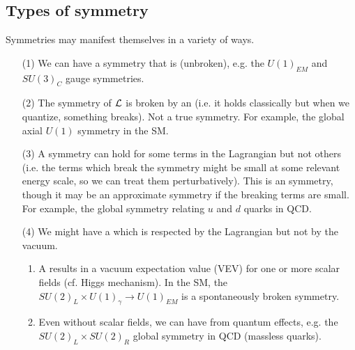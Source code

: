 \subsection*{Types of symmetry}
Symmetries may manifest themselves in a variety of ways.
\begin{enumerate}
    \item[(1)] We can have a symmetry that is  (unbroken), e.g. the $U(1)_{EM}$ and $SU(3)_C$ gauge symmetries.
    \item[(2)] The symmetry of $\mathcal L$ is broken by an  (i.e. it holds classically but when we quantize, something breaks). Not a true symmetry. For example, the global axial $U(1)$ symmetry in the SM.
    \item[(3)] A symmetry can hold for some terms in the Lagrangian but not others (i.e. the terms which break the symmetry might be small at some relevant energy scale, so we can treat them perturbatively). This is an  symmetry, though it may be an approximate symmetry if the breaking terms are small. For example, the global  symmetry relating $u$ and $d$ quarks in QCD.
    \item[(4)] We might have a  which is respected by the Lagrangian but not by the vacuum.
    \begin{enumerate}
        \item A  results in a vacuum expectation value (VEV) for one or more scalar fields (cf. Higgs mechanism). In the SM, the $SU(2)_L \times U(1)_\gamma \to U(1)_{EM}$ is a spontaneously broken symmetry.
        \item Even without scalar fields, we can have  from quantum effects, e.g. the $SU(2)_L\times SU(2)_R$ global symmetry in QCD (massless quarks).
    \end{enumerate}
\end{enumerate}

